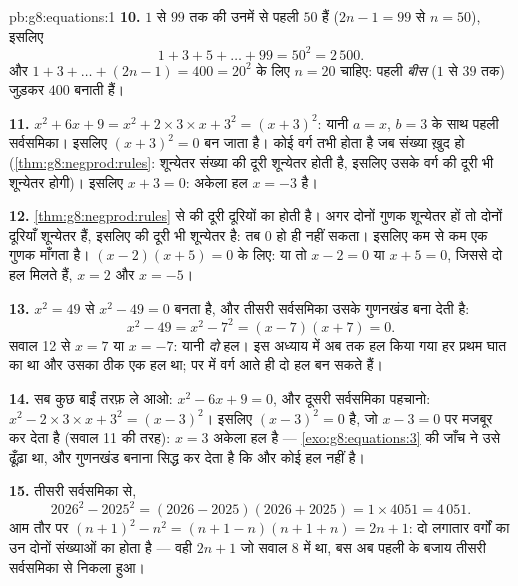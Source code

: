 \begin{solution}{pb:g8:equations:1}
\textbf{10.} $1$ से $99$ तक की  उनमें से पहली $50$
हैं ($2n - 1 = 99$ से $n = 50$), इसलिए
\[
1 + 3 + 5 + \dots + 99 = 50^2 = 2\,500 .
\]
और $1 + 3 + \dots + (2n - 1) = 400 = 20^2$ के लिए $n = 20$ चाहिए:
पहली \emph{बीस}  ($1$ से $39$ तक) जुड़कर $400$ बनाती
हैं।

\textbf{11.} $x^2 + 6x + 9 = x^2 + 2 \times 3 \times x + 3^2 =
(x + 3)^2$: यानी $a = x$, $b = 3$ के साथ पहली सर्वसमिका। इसलिए
 $(x + 3)^2 = 0$ बन जाता है। कोई वर्ग  तभी होता है जब
संख्या ख़ुद  हो (\cref{thm:g8:negprod:rules}: शून्येतर संख्या
की दूरी शून्येतर होती है, इसलिए उसके वर्ग की दूरी भी शून्येतर
होगी)। इसलिए $x + 3 = 0$: अकेला हल $x = -3$ है।

\textbf{12.} \cref{thm:g8:negprod:rules} से  की दूरी दूरियों
का  होती है। अगर दोनों गुणक शून्येतर हों तो दोनों दूरियाँ
शून्येतर हैं, इसलिए  की दूरी भी शून्येतर है: तब  $0$ हो
ही नहीं सकता। इसलिए   कम से कम एक  गुणक माँगता है।
$(x - 2)(x + 5) = 0$ के लिए: या तो $x - 2 = 0$ या $x + 5 = 0$,
जिससे दो हल मिलते हैं, $x = 2$ और $x = -5$।

\textbf{13.} $x^2 = 49$ से $x^2 - 49 = 0$ बनता है, और तीसरी
सर्वसमिका उसके गुणनखंड बना देती है:
\[
x^2 - 49 = x^2 - 7^2 = (x - 7)(x + 7) = 0 .
\]
सवाल 12 से $x = 7$ या $x = -7$: यानी \emph{दो} हल। इस अध्याय में
अब तक हल किया गया हर  प्रथम घात का था और उसका ठीक एक हल था;
पर  में वर्ग आते ही दो हल बन सकते हैं।

\textbf{14.} सब कुछ बाईं तरफ़ ले आओ: $x^2 - 6x + 9 = 0$, और दूसरी
सर्वसमिका पहचानो: $x^2 - 2 \times 3 \times x + 3^2 = (x - 3)^2$।
इसलिए  $(x - 3)^2 = 0$ है, जो $x - 3 = 0$ पर मजबूर कर देता
है (सवाल 11 की तरह): $x = 3$ अकेला हल है ---
\cref{exo:g8:equations:3} की जाँच ने उसे ढूँढ़ा था, और गुणनखंड
बनाना सिद्ध कर देता है कि और कोई हल नहीं है।

\textbf{15.} तीसरी सर्वसमिका से,
\[
2026^2 - 2025^2 = (2026 - 2025)(2026 + 2025)
= 1 \times 4051 = 4\,051 .
\]
आम तौर पर $(n+1)^2 - n^2 = (n + 1 - n)(n + 1 + n) = 2n + 1$: दो
लगातार वर्गों का  उन दोनों संख्याओं का  होता है --- वही
$2n + 1$ जो सवाल 8 में था, बस अब पहली के बजाय तीसरी सर्वसमिका से
निकला हुआ।

\end{solution}
